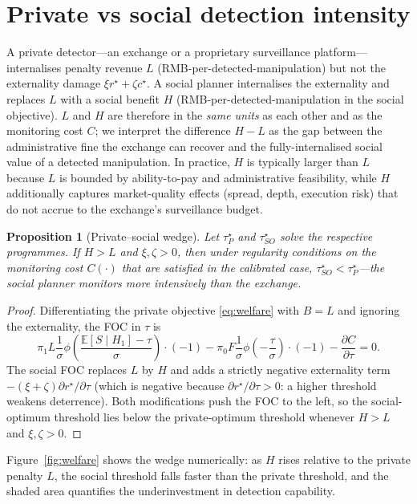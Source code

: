 \documentclass[11pt,a4paper]{article}
\newtheorem{proposition}[theorem]{Proposition}
\theoremstyle{definition}
\theoremstyle{remark}
\newcommand{\E}{\mathbb{E}}
\newcommand{\1}{\mathbf{1}}
\begin{document}
\section{Private vs social detection intensity}
\label{sec:welfare}

A private detector---an exchange or a proprietary surveillance platform---internalises penalty revenue $L$ (RMB-per-detected-manipulation) but not the externality damage $\xi r^\star + \zeta c^\star$. A social planner internalises the externality and replaces $L$ with a social benefit $H$ (RMB-per-detected-manipulation in the social objective). $L$ and $H$ are therefore in the \emph{same units} as each other and as the monitoring cost $C$; we interpret the difference $H-L$ as the gap between the administrative fine the exchange can recover and the fully-internalised social value of a detected manipulation. In practice, $H$ is typically larger than $L$ because $L$ is bounded by ability-to-pay and administrative feasibility, while $H$ additionally captures market-quality effects (spread, depth, execution risk) that do not accrue to the exchange's surveillance budget.

\begin{proposition}[Private--social wedge]
\label{prop:welfare}
Let $\tau^\star_P$ and $\tau^\star_{SO}$ solve the respective programmes. If $H>L$ and $\xi,\zeta>0$, then under regularity conditions on the monitoring cost $C(\cdot)$ that are satisfied in the calibrated case, $\tau^\star_{SO}<\tau^\star_P$—the social planner monitors more intensively than the exchange.
\end{proposition}

\begin{proof}
Differentiating the private objective \eqref{eq:welfare} with $B=L$ and ignoring the externality, the FOC in $\tau$ is
\[
\pi_1 L \frac{1}{\sigma}\phi\!\left(\frac{\E[S\mid H_1]-\tau}{\sigma}\right)\cdot(-1) - \pi_0 F \frac{1}{\sigma}\phi\!\left(-\frac{\tau}{\sigma}\right)\cdot(-1) - \frac{\partial C}{\partial\tau}=0.
\]
The social FOC replaces $L$ by $H$ and adds a strictly negative externality term $-(\xi+\zeta)\partial r^\star/\partial\tau$ (which is negative because $\partial r^\star/\partial\tau>0$: a higher threshold weakens deterrence). Both modifications push the FOC to the left, so the social-optimum threshold lies below the private-optimum threshold whenever $H>L$ and $\xi,\zeta>0$.
\end{proof}

Figure~\ref{fig:welfare} shows the wedge numerically: as $H$ rises relative to the private penalty $L$, the social threshold falls faster than the private threshold, and the shaded area quantifies the underinvestment in detection capability.
\end{document}
